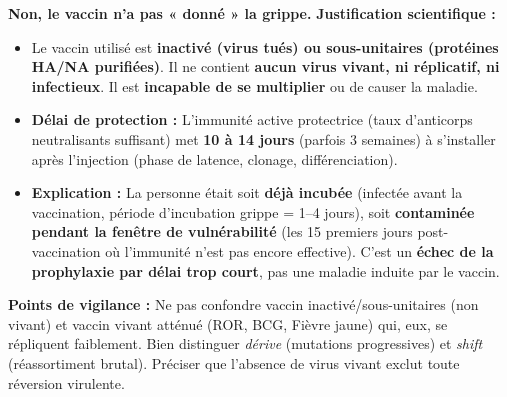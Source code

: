\documentclass[11pt]{article}
\begin{document}
\begin{corrige}
\begin{enumerate}
    \textbf{Non, le vaccin n'a pas « donné » la grippe.}
    \textbf{Justification scientifique :}
    \begin{itemize}
        \item Le vaccin utilisé est \textbf{inactivé (virus tués) ou sous-unitaires (protéines HA/NA purifiées)}. Il ne contient \textbf{aucun virus vivant, ni réplicatif, ni infectieux}. Il est \textbf{incapable de se multiplier} ou de causer la maladie.
        \item \textbf{Délai de protection :} L'immunité active protectrice (taux d'anticorps neutralisants suffisant) met \textbf{10 à 14 jours} (parfois 3 semaines) à s'installer après l'injection (phase de latence, clonage, différenciation).
        \item \textbf{Explication :} La personne était soit \textbf{déjà incubée} (infectée avant la vaccination, période d'incubation grippe = 1--4 jours), soit \textbf{contaminée pendant la fenêtre de vulnérabilité} (les 15 premiers jours post-vaccination où l'immunité n'est pas encore effective). C'est un \textbf{échec de la prophylaxie par délai trop court}, pas une maladie induite par le vaccin.
    \end{itemize}
\end{enumerate}
\textbf{Points de vigilance :} Ne pas confondre vaccin inactivé/sous-unitaires (non vivant) et vaccin vivant atténué (ROR, BCG, Fièvre jaune) qui, eux, se répliquent faiblement. Bien distinguer \emph{dérive} (mutations progressives) et \emph{shift} (réassortiment brutal). Préciser que l'absence de virus vivant exclut toute réversion virulente.
\end{corrige}
\end{document}

